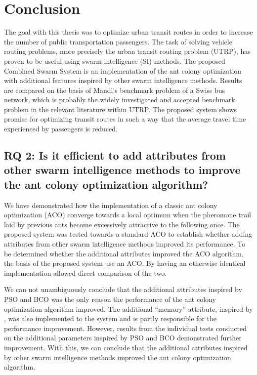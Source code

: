 \section{Conclusion}
\label{sec:conclusion}

The goal with this thesis was to optimize urban transit routes in order to increase the number of public transportation passengers. The task of solving vehicle routing problems, more precisely the urban transit routing problem (UTRP), has proven to be useful using swarm intelligence (SI) methods. The proposed Combined Swarm System is an implementation of the ant colony optimization with additional features inspired by other swarm intelligence methods. Results are compared on the basis of Mandl's benchmark problem of a Swiss bus network, which is probably the widely investigated and accepted benchmark problem in the relevant literature within UTRP. The proposed system shows promise for optimizing transit routes in such a way that the average travel time experienced by passengers is reduced. 

\subsection*{RQ 2: Is it efficient to add attributes from other swarm intelligence methods to improve the ant colony optimization algorithm?}

We have demonstrated how the implementation of a classic ant colony optimization (ACO) converge towards a local optimum when the pheromone trail laid by previous ants become excessively attractive to the following once. The proposed system was tested towards a standard ACO to establish whether adding attributes from other swarm intelligence methods improved its performance. To be determined whether the additional attributes improved the ACO algorithm, the basis of the proposed system use an ACO. By having an otherwise identical implementation allowed direct comparison of the two. %

We can not unambiguously conclude that the additional attributes inspired by PSO and BCO was the only reason the performance of the ant colony optimization algorithm improved. The additional ``memory'' attribute, inspired by \citet{dorigo96, sedighpour14, poorzahedy11, salehinejad10}, was also implemented to the system and is partly responsible for the performance improvement. However, results from the individual tests conducted on the additional parameters inspired by PSO and BCO demonstrated further improvement. With this, we can conclude that the additional attributes inspired by other swarm intelligence methods improved the ant colony optimization algorithm. 

